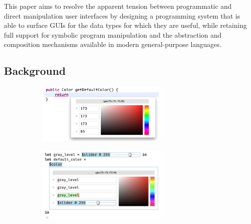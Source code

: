 This paper aims to resolve the apparent tension between
programmatic and direct manipulation user interfaces by designing a programming system that
is able to surface GUIs for the data types for which
they are useful, while retaining full support for symbolic program manipulation
and the abstraction and composition mechanisms
available in modern general-purpose languages.

\subsection{Background}
\begin{figure}
  \begin{center}
    \begin{subfigure}[t]{0.5\textwidth}
      \centering
      \vspace{-3.4cm}
      \includegraphics[width=15pc]{graphite-color-palette.png}
      \vspace{0.45cm}
      \caption{}
    \end{subfigure}\begin{subfigure}[t]{0.5\textwidth}
      \centering
      \includegraphics[width=15pc]{slider-color-livelits.png}
      \caption{}
    \end{subfigure}
  \end{center}

\end{figure}
